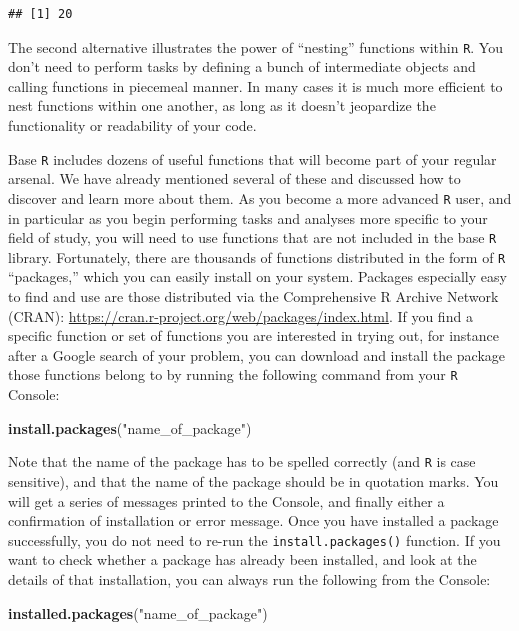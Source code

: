 \documentclass[]{book}
\newenvironment{Shaded}{\begin{snugshade}}{\end{snugshade}}
\newcommand{\KeywordTok}[1]{\textcolor[rgb]{0.13,0.29,0.53}{\textbf{#1}}}
\newcommand{\NormalTok}[1]{#1}
\newcommand{\StringTok}[1]{\textcolor[rgb]{0.31,0.60,0.02}{#1}}
\begin{document}
\begin{verbatim}
## [1] 20
\end{verbatim}

The second alternative illustrates the power of ``nesting'' functions within \texttt{R}. You don't need to perform tasks by defining a bunch of intermediate objects and calling functions in piecemeal manner. In many cases it is much more efficient to nest functions within one another, as long as it doesn't jeopardize the functionality or readability of your code.

Base \texttt{R} includes dozens of useful functions that will become part of your regular arsenal. We have already mentioned several of these and discussed how to discover and learn more about them. As you become a more advanced \texttt{R} user, and in particular as you begin performing tasks and analyses more specific to your field of study, you will need to use functions that are not included in the base \texttt{R} library. Fortunately, there are thousands of functions distributed in the form of \texttt{R} ``packages,'' which you can easily install on your system. Packages especially easy to find and use are those distributed via the Comprehensive R Archive Network (CRAN): \url{https://cran.r-project.org/web/packages/index.html}. If you find a specific function or set of functions you are interested in trying out, for instance after a Google search of your problem, you can download and install the package those functions belong to by running the following command from your \texttt{R} Console:

\begin{Shaded}
\begin{Highlighting}[]
\KeywordTok{install.packages}\NormalTok{(}\StringTok{"name_of_package"}\NormalTok{)}
\end{Highlighting}
\end{Shaded}

Note that the name of the package has to be spelled correctly (and \texttt{R} is case sensitive), and that the name of the package should be in quotation marks. You will get a series of messages printed to the Console, and finally either a confirmation of installation or error message. Once you have installed a package successfully, you do not need to re-run the \texttt{install.packages()} function. If you want to check whether a package has already been installed, and look at the details of that installation, you can always run the following from the Console:

\begin{Shaded}
\begin{Highlighting}[]
\KeywordTok{installed.packages}\NormalTok{(}\StringTok{"name_of_package"}\NormalTok{)}
\end{Highlighting}
\end{Shaded}
\end{document}
